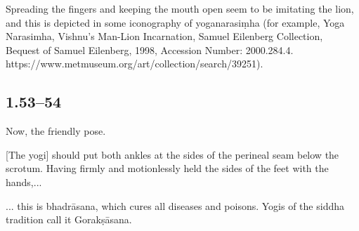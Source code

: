 \begin{ekdosis}
\begin{testimonia}[hp01_050]
\begin{versinnote}
\end{versinnote}

\end{testimonia}

\begin{philcomm}[hp01_051]

Spreading the fingers and keeping the mouth open seem to be imitating the lion, and this is depicted in some iconography of yoganarasiṃha (for example, Yoga Narasimha, Vishnu's Man-Lion Incarnation, Samuel Eilenberg Collection, Bequest of Samuel Eilenberg, 1998, Accession Number: 2000.284.4. https://www.metmuseum.org/art/collection/search/39251).  
\end{philcomm}


\subsection*{1.53--54}
\begin{translation}[hp01_053]
Now, the friendly pose.

[The yogi] should put both ankles at the sides of the perineal seam below the scrotum.  Having firmly and motionlessly held the sides of the feet with the hands,...
\end{translation}

\begin{translation}[hp01_054]
... this is bhadrāsana, which cures all diseases and poisons. Yogis of the siddha tradition call it Gorakṣāsana.
\end{translation}


\end{ekdosis}
